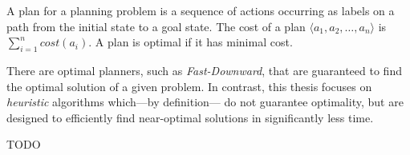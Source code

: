 \begin{definition}[Plan]
	\label{def:plan}
	A plan for a planning problem is a sequence of actions occurring as labels on a path
	from the initial state to a goal state.
	The cost of a plan $\langle a_1, a_2, \dots, a_n \rangle$ is $\sum_{i = 1}^n cost(a_i)$.
	A plan is optimal if it has minimal cost.
\end{definition}

There are optimal planners, such as \textit{Fast-Downward}, that are guaranteed to find the optimal solution of a given problem.
In contrast, this thesis focuses on \textit{heuristic} algorithms which—by definition— do not
guarantee optimality, but are designed to efficiently find near-optimal solutions in significantly less time.

TODO
